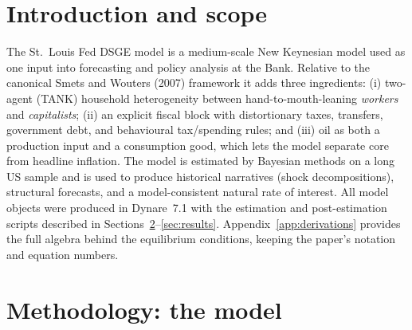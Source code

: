 \documentclass[11pt]{article}
\theoremstyle{definition}
\begin{document}
\section{Introduction and scope}\label{sec:intro}
The St.\ Louis Fed DSGE model is a medium-scale New Keynesian model used as one input into forecasting
and policy analysis at the Bank. Relative to the canonical Smets and Wouters (2007) framework it adds
three ingredients: (i) two-agent (TANK) household heterogeneity between hand-to-mouth-leaning
\emph{workers} and \emph{capitalists}; (ii) an explicit fiscal block with distortionary taxes,
transfers, government debt, and behavioural tax/spending rules; and (iii) oil as both a production input
and a consumption good, which lets the model separate core from headline inflation. The model is
estimated by Bayesian methods on a long US sample and is used to produce historical narratives (shock
decompositions), structural forecasts, and a model-consistent natural rate of interest. All model objects were produced in Dynare~7.1 with
the estimation and post-estimation scripts described in Sections~\ref{sec:methodology}--\ref{sec:results}.
Appendix~\ref{app:derivations} provides the full algebra behind the equilibrium conditions, keeping the
paper's notation and equation numbers.

\section{Methodology: the model}\label{sec:methodology}
\end{document}
